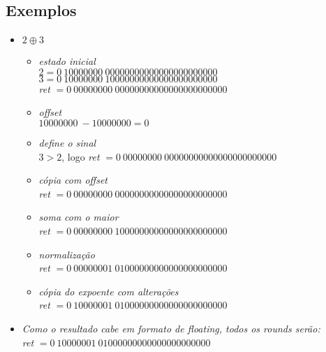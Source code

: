 \documentclass{article}
\begin{document}
\subsection*{Exemplos}
\begin{itemize}
\item $2 \oplus 3$
    \begin{itemize}
        
    \item \textit{estado inicial} \\    
    $2 = {0}\ {10000000}\ {00000000000000000000000}$ \\
    $3 = {0}\ {10000000}\ {10000000000000000000000}$ \\
    \textit{ret} $= {0}\ {00000000}\ {00000000000000000000000}$ \\

    \item \textit{offset} \\
    ${10000000}\ - {10000000} = 0$
    
    \item \textit{define o sinal} \\
    $ 3 > 2$, logo \textit{ret} $= {0}\ {00000000}\ {00000000000000000000000}$
      
    \item \textit{cópia com offset} \\
    \textit{ret} $= {0}\ {00000000}\ {00000000000000000000000}$
      
    \item \textit{soma com o maior} \\
    \textit{ret} $= {0}\ {00000000}\ {10000000000000000000000}$

    \item \textit{normalização} \\
    \textit{ret} $= {0}\ {00000001}\ {01000000000000000000000}$
    
    \item \textit{cópia do expoente com alterações} \\
    \textit{ret} $= {0}\ {10000001}\ {01000000000000000000000}$
    \end{itemize}

    \item \textit{Como o resultado cabe em formato de floating, todos os rounds serão:} \\
    \textit{ret} $= {0}\ {10000001}\ {01000000000000000000000}$
    \end{itemize}
\end{document}
